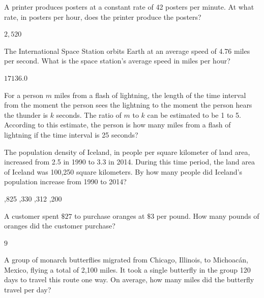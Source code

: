 \question[1]
A printer produces posters at a constant rate of 42 posters per minute. At what rate, in posters per hour, does the printer produce the posters?
\begin{solutionorbox}[1.25in]
  $2{,}520$
\end{solutionorbox}




\newpage



\question[1]
The International Space Station orbits Earth at an average speed of 4.76 miles per second. What is the space station's average speed in miles per hour?
\begin{choices}
  \CorrectChoice $17136.0$
\end{choices}



\question[1]
For a person $m$ miles from a flash of lightning, the length of the time interval from the moment the person sees the lightning to the moment the person hears the thunder is $k$ seconds. The ratio of $m$ to $k$ can be estimated to be 1 to 5. According to this estimate, the person is how many miles from a flash of lightning if the time interval is 25 seconds?
\begin{choices}
\end{choices}

\question[1]
The population density of Iceland, in people per square kilometer of land area, increased from 2.5 in 1990 to 3.3 in 2014. During this time period, the land area of Iceland was 100,250 square kilometers. By how many people did Iceland's population increase from 1990 to 2014?
\begin{choices}
  ,825
  ,330
  ,312
  ,200
\end{choices}


\newpage



\question[1]
A customer spent $\$ 27$ to purchase oranges at $\$ 3$ per pound. How many pounds of oranges did the customer purchase?
\begin{solutionorbox}[1.25in]
  $9$
\end{solutionorbox}

\question[1]
A group of monarch butterflies migrated from Chicago, Illinois, to Michoacán, Mexico, flying a total of 2,100 miles. It took a single butterfly in the group 120 days to travel this route one way. On average, how many miles did the butterfly travel per day?
\begin{choices}
\end{choices}

